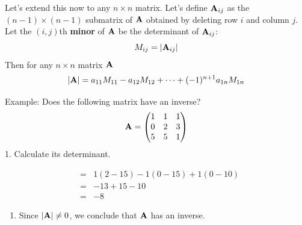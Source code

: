 \documentclass[]{book}
\providecommand{\tightlist}{%
  \setlength{\itemsep}{0pt}\setlength{\parskip}{0pt}}
\theoremstyle{definition}
\theoremstyle{definition}
\theoremstyle{definition}
\theoremstyle{remark}
\begin{document}
Let's extend this now to any \(n\times n\) matrix. Let's define
\({\bf A}_{ij}\) as the \((n-1)\times (n-1)\) submatrix of \({\bf A}\)
obtained by deleting row \(i\) and column \(j\). Let the \((i,j)\)th
\textbf{minor} of \({\bf A}\) be the determinant of \({\bf A}_{ij}\):
\[M_{ij}=|{\bf A}_{ij}|\] Then for any \(n\times n\) matrix \({\bf A}\)
\[|{\bf A}|= a_{11}M_{11} - a_{12}M_{12} + \cdots + (-1)^{n+1} a_{1n} M_{1n}\]

Example: Does the following matrix have an inverse?
\[{\bf A}=\begin{pmatrix} 1&1&1\\0&2&3\\5&5&1 \end{pmatrix}\] 1.
Calculate its determinant.

\begin{eqnarray}
                &=& 1(2-15) - 1(0-15) + 1(0-10) \nonumber\\
                &=& -13+15-10 \nonumber\\
                &=& -8\nonumber
\end{eqnarray}

\begin{enumerate}
\def\labelenumi{\arabic{enumi}.}
\setcounter{enumi}{1}
\tightlist
\item
  Since \(|{\bf A}|\ne 0\), we conclude that \({\bf A}\) has an inverse.
\end{enumerate}
\end{document}
